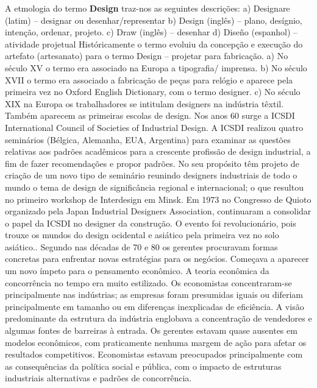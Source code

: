 \documentclass[twoside,twocolumn]{article}
\begin{document}
A etmologia do termo \textbf{Design} traz-nos as seguintes descrições: 
\newline \indent a) Designare (latim) – designar ou desenhar/representar
\newline \indent b) Design (inglês) – plano, desígnio, intenção, ordenar, projeto.
\newline \indent c) Draw (inglês) – desenhar
\newline \indent d) Diseño (espanhol) – atividade projetual
\newline Históricamente o termo evoluiu da concepção e execução do artefato (artesanato) para o termo Design – projetar para fabricação.
\newline \indent a) No século XV o termo era associado na Europa a tipografia/ imprensa.
\newline \indent b) No século XVII o termo era associado a fabricação de peças para relógio e aparece pela primeira vez no Oxford English Dictionary, com o termo designer.
\newline \indent c) No século XIX na Europa os trabalhadores se intitulam designers na indústria têxtil. Também aparecem as primeiras escolas de design. %
\newline \newline \indent Nos anos 60 surge a ICSDI International Council of Societies of Industrial Design. A ICSDI realizou quatro seminários (Bélgica, Alemanha, EUA, Argentina) para examinar as questões relativas aos padrões acadêmicos para a crescente profissão de design industrial, a fim de fazer recomendações e propor padrões.
No seu propósito têm projeto de criação de um novo tipo de seminário reunindo designers industriais de todo o mundo o tema de design de significância regional e internacional; o que resultou no primeiro workshop de Interdesign em Minsk. 
Em 1973 no Congresso de Quioto organizado pela Japan Industrial Designers Association, continuaram a consolidar o papel da ICSDI no designer da construção. O evento foi revolucionário, pois trouxe os mundos do design ocidental e asiático pela primeira vez no solo asiático.\citep{WDO}.
\newline \indent Segundo \citep{Porter1990} nas décadas de 70 e 80 os gerentes procuravam formas concretas para enfrentar novas estratégias para os negócios. Começava a aparecer um novo ímpeto para o pensamento econômico. A teoria econômica da concorrência no tempo era muito estilizado. Os economistas concentraram-se principalmente nas indústrias; as empresas foram presumidas iguais ou diferiam principalmente em tamanho ou em diferenças inexplicadas de eficiência. A visão predominante da estrutura da indústria englobava a concentração de vendedores e algumas fontes de barreiras à entrada. Os gerentes estavam quase ausentes em modelos econômicos, com praticamente nenhuma margem de ação para afetar os resultados competitivos. Economistas estavam preocupados principalmente com as consequências da política social e pública, com o impacto de estruturas industriais alternativas e padrões de concorrência.
\end{document}
